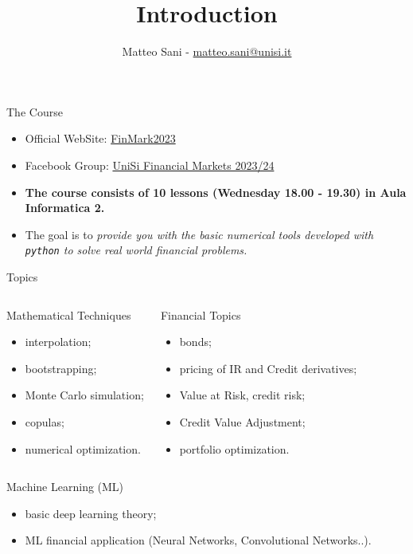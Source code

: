 \documentclass{beamer}
\title{Introduction}
\author{Matteo Sani - \href{mailto:matteo.sani@unisi.it}{matteo.sani@unisi.it}}
\begin{document}
\begin{frame}[plain]
  \maketitle
\end{frame}

\begin{frame}{The Course}
  \begin{itemize}
  \item Official WebSite: \href{https://sites.google.com/view/finmark2023}{FinMark2023}
  \item Facebook Group: \href{https://www.facebook.com/groups/1484320032353854}{UniSi Financial Markets 2023/24}
  \item \textbf{The course consists of 10 lessons (Wednesday 18.00 - 19.30) in Aula Informatica 2.}
  \item The goal is to \emph{provide you with the basic numerical tools developed with \texttt{python} to solve real world financial problems.}
  \end{itemize}
\end{frame}

\begin{frame}{Topics}
  \begin{columns}
    \begin{block}{Mathematical Techniques}
      \begin{itemize}
      \item interpolation;
      \item bootstrapping;
      \item Monte Carlo simulation;
      \item copulas;
      \item numerical optimization.
      \end{itemize}
    \end{block}
    \begin{block}{Financial Topics}
      \begin{itemize}
      \item bonds;
      \item pricing of IR and Credit derivatives;
      \item Value at Risk, credit risk;
      \item Credit Value Adjustment;
      \item portfolio optimization.
      \end{itemize}
    \end{block}
  \end{columns}
  \begin{block}{Machine Learning (ML)}
    \begin{itemize}
    \item basic deep learning theory;
    \item ML financial application (Neural Networks, Convolutional Networks..).
    \end{itemize}
  \end{block}
\end{frame}
\end{document}
